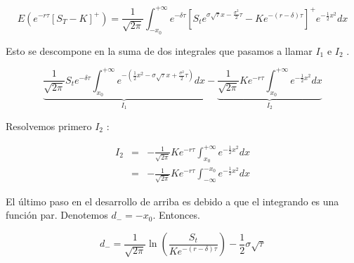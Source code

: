 \documentclass[12pt]{article}
\begin{document}
\begin{equation}
	E\left( e^{-r\tau} \left[ S_{T} - K \right] ^{+} \right) = \frac{1}{\sqrt{2\pi}}\int_{-x_{0}}^{+\infty}e^{-\delta\tau}
	\left[S_{t}e^{\sigma\sqrt{\tau}x-\frac{\sigma^{2}}{2}\tau}-Ke^{-(r-\delta)\tau}\right]^{+}e^{-
	\frac{1}{2}x^{2}}dx
\end{equation}
\newline

Esto se descompone en la suma de dos integrales que pasamos a llamar $I_{1}$ e $I_{2}$ .
\newline

\begin{equation}
	\underbrace{\frac{1}{\sqrt{2\pi}}S_{t}e^{-\delta\tau}\int_{x_{0}}^{+\infty}e^{-\left(\frac{1}{2}x^{2}-\sigma\sqrt{\tau}x
	 + \frac{\sigma^{2}}{2}\tau\right)}dx}_{I_{1}} - \underbrace{\frac{1}{\sqrt{2\pi}}Ke^{-r\tau}\int_{x_0}^{+\infty}
	e^{-\frac{1}{2}x^{2}}dx}_{I_{2}}
\end{equation}
\newline

Resolvemos primero $I_{2}$ :

\begin{eqnarray}
	I_{2} 	& = & -\frac{1}{\sqrt{2\pi}}Ke^{-r\tau}\int_{x_{0}}^{+\infty}e^{-\frac{1}{2}x^{2}}dx \nonumber \\
	      	& = & -\frac{1}{\sqrt{2\pi}}Ke^{-r\tau}\int_{-\infty}^{-x_{0}}e^{-\frac{1}{2}x^{2}}dx
\end{eqnarray}

El \'{u}ltimo paso en el desarrollo de arriba es debido a que el integrando es una funci\'{o}n par. Denotemos $d_{-} = -x_{0}$. Entonces.
\newline

\begin{equation}
	d_{-} = \frac{1}{\sqrt{2\pi}}\ln\left(\frac{S_{t}}{Ke^{-\left(r-\delta\right)\tau}}\right) - 
	\frac{1}{2}\sigma\sqrt{\tau}	
\end{equation}
\end{document}
